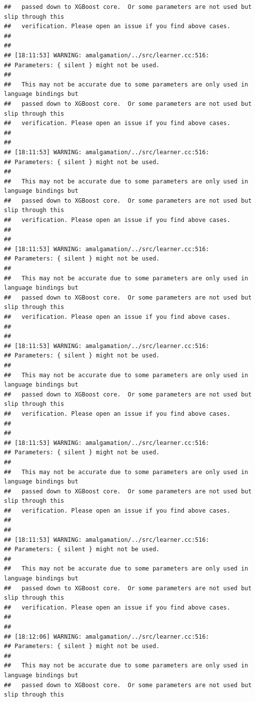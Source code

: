 \documentclass[AMS,STIX2COL]{WileyNJD-v2}\usepackage[]{graphicx}\usepackage[]{color}
\makeatletter
\newenvironment{kframe}{%
 \def\at@end@of@kframe{}%
 \ifinner\ifhmode%
  \def\at@end@of@kframe{\end{minipage}}%
  \begin{minipage}{\columnwidth}%
 \fi\fi%
 \def\FrameCommand##1{\hskip\@totalleftmargin \hskip-\fboxsep
 \colorbox{shadecolor}{##1}\hskip-\fboxsep
     \hskip-\linewidth \hskip-\@totalleftmargin \hskip\columnwidth}%
 \MakeFramed {\advance\hsize-\width
   \@totalleftmargin\z@ \linewidth\hsize
   \@setminipage}}%
 {\par\unskip\endMakeFramed%
 \at@end@of@kframe}
\newenvironment{knitrout}{}{} %
\makeatother
\begin{document}
\begin{knitrout}
\begin{kframe}
\begin{verbatim}
##   passed down to XGBoost core.  Or some parameters are not used but slip through this
##   verification. Please open an issue if you find above cases.
## 
## 
## [18:11:53] WARNING: amalgamation/../src/learner.cc:516: 
## Parameters: { silent } might not be used.
## 
##   This may not be accurate due to some parameters are only used in language bindings but
##   passed down to XGBoost core.  Or some parameters are not used but slip through this
##   verification. Please open an issue if you find above cases.
## 
## 
## [18:11:53] WARNING: amalgamation/../src/learner.cc:516: 
## Parameters: { silent } might not be used.
## 
##   This may not be accurate due to some parameters are only used in language bindings but
##   passed down to XGBoost core.  Or some parameters are not used but slip through this
##   verification. Please open an issue if you find above cases.
## 
## 
## [18:11:53] WARNING: amalgamation/../src/learner.cc:516: 
## Parameters: { silent } might not be used.
## 
##   This may not be accurate due to some parameters are only used in language bindings but
##   passed down to XGBoost core.  Or some parameters are not used but slip through this
##   verification. Please open an issue if you find above cases.
## 
## 
## [18:11:53] WARNING: amalgamation/../src/learner.cc:516: 
## Parameters: { silent } might not be used.
## 
##   This may not be accurate due to some parameters are only used in language bindings but
##   passed down to XGBoost core.  Or some parameters are not used but slip through this
##   verification. Please open an issue if you find above cases.
## 
## 
## [18:11:53] WARNING: amalgamation/../src/learner.cc:516: 
## Parameters: { silent } might not be used.
## 
##   This may not be accurate due to some parameters are only used in language bindings but
##   passed down to XGBoost core.  Or some parameters are not used but slip through this
##   verification. Please open an issue if you find above cases.
## 
## 
## [18:11:53] WARNING: amalgamation/../src/learner.cc:516: 
## Parameters: { silent } might not be used.
## 
##   This may not be accurate due to some parameters are only used in language bindings but
##   passed down to XGBoost core.  Or some parameters are not used but slip through this
##   verification. Please open an issue if you find above cases.
## 
## 
## [18:12:06] WARNING: amalgamation/../src/learner.cc:516: 
## Parameters: { silent } might not be used.
## 
##   This may not be accurate due to some parameters are only used in language bindings but
##   passed down to XGBoost core.  Or some parameters are not used but slip through this

\end{verbatim}
\end{kframe}
\end{knitrout}
\end{document}
